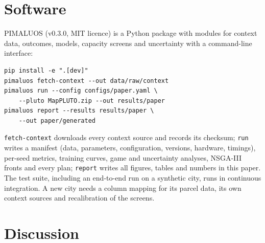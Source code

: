 \documentclass[preprint,12pt]{elsarticle}
\begin{document}
\begin{table}[t]
\centering\small
\caption{Share of \NUncDraws{} parameter draws (\%) in which the verified PIMALUOS plan is better than each verified comparator.}
\label{tab:unc}
\end{table}

\section{Software}

PIMALUOS (v0.3.0, MIT licence) is a Python package with modules for context data, outcomes, models, capacity screens and uncertainty with a command-line interface:
{\small
\begin{verbatim}
pip install -e ".[dev]"
pimaluos fetch-context --out data/raw/context
pimaluos run --config configs/paper.yaml \
    --pluto MapPLUTO.zip --out results/paper
pimaluos report --results results/paper \
    --out paper/generated
\end{verbatim}}
\texttt{fetch-context} downloads every context source and records its checksum; \texttt{run} writes a manifest (data, parameters, configuration, versions, hardware, timings), per-seed metrics, training curves, game and uncertainty analyses, NSGA-III fronts and every plan; \texttt{report} writes all figures, tables and numbers in this paper. The test suite, including an end-to-end run on a synthetic city, runs in continuous integration. A new city needs a column mapping for its parcel data, its own context sources and recalibration of the screens.

\section{Discussion}
\end{document}

